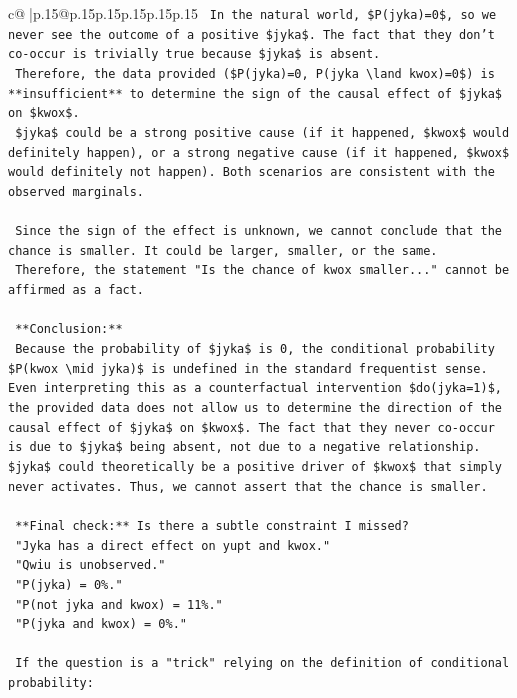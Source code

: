 \documentclass{article}
\begin{document}
{\begin{supertabular}{c@{$\;$}|p{.15\linewidth}@{}p{.15\linewidth}p{.15\linewidth}p{.15\linewidth}p{.15\linewidth}p{.15\linewidth}}
{{{\texttt{        In the natural world, \$P(jyka)=0\$, so we never see the outcome of a positive \$jyka\$. The fact that they don't co{-}occur is trivially true because \$jyka\$ is absent.} \\
\texttt{        Therefore, the data provided (\$P(jyka)=0, P(jyka \textbackslash{}land kwox)=0\$) is **insufficient** to determine the sign of the causal effect of \$jyka\$ on \$kwox\$.} \\
\texttt{        \$jyka\$ could be a strong positive cause (if it happened, \$kwox\$ would definitely happen), or a strong negative cause (if it happened, \$kwox\$ would definitely not happen). Both scenarios are consistent with the observed marginals.} \\
\\ 
\texttt{        Since the sign of the effect is unknown, we cannot conclude that the chance is smaller. It could be larger, smaller, or the same.} \\
\texttt{        Therefore, the statement "Is the chance of kwox smaller..." cannot be affirmed as a fact.} \\
\\ 
\texttt{        **Conclusion:**} \\
\texttt{        Because the probability of \$jyka\$ is 0, the conditional probability \$P(kwox \textbackslash{}mid jyka)\$ is undefined in the standard frequentist sense. Even interpreting this as a counterfactual intervention \$do(jyka=1)\$, the provided data does not allow us to determine the direction of the causal effect of \$jyka\$ on \$kwox\$. The fact that they never co{-}occur is due to \$jyka\$ being absent, not due to a negative relationship. \$jyka\$ could theoretically be a positive driver of \$kwox\$ that simply never activates. Thus, we cannot assert that the chance is smaller.} \\
\\ 
\texttt{        **Final check:** Is there a subtle constraint I missed?} \\
\texttt{        "Jyka has a direct effect on yupt and kwox."} \\
\texttt{        "Qwiu is unobserved."} \\
\texttt{        "P(jyka) = 0\%."} \\
\texttt{        "P(not jyka and kwox) = 11\%."} \\
\texttt{        "P(jyka and kwox) = 0\%."} \\
\\ 
\texttt{        If the question is a "trick" relying on the definition of conditional probability:} \\
}}}
\end{supertabular}}
\end{document}
